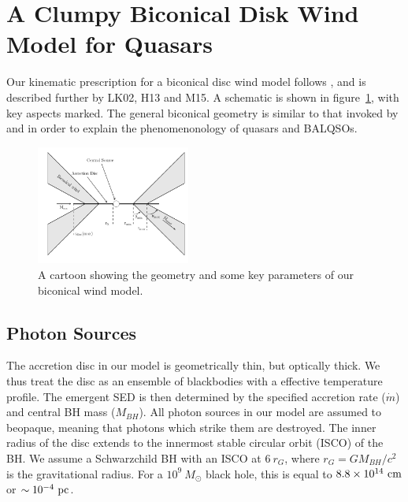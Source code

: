 \documentclass[useAMS,usenatbib]{mn2e_x}
\begin{document}




\section{A Clumpy Biconical Disk Wind Model for Quasars}

Our kinematic prescription for a biconical disc wind model
follows \cite{SV93}, and is described further by
LK02, H13 and M15. A schematic is shown in figure~\ref{fig:cartoon},
with key aspects marked. The general biconical
geometry is similar to that invoked by \cite{MCGV95} and 
\cite{elvis2000} in order to explain the phenomenonology
of quasars and BALQSOs.


\begin{figure} 
\centering
\includegraphics[width=0.45\textwidth]{figures/fig2_cartoon.png}
\caption
{
A cartoon showing the geometry and some key parameters of
our biconical wind model.
}
\label{fig:cartoon}
\end{figure} 





\subsection{Photon Sources}


The accretion disc in our model is geometrically thin, but optically thick.
We thus treat the disc as an ensemble of blackbodies with a 
\cite{shakurasunyaev1973} effective temperature profile. 
The emergent SED is then determined by the specified accretion rate ($\dot{m}$)
and central BH mass ($M_{BH}$).
All photon sources in our model are assumed to beopaque, meaning
that photons which strike them are destroyed.
The inner radius of the disc extends to the innermost 
stable circular orbit (ISCO) of the BH. 
We assume a Schwarzchild BH with an ISCO at $6~r_G$, where 
$r_G = GM_{BH}/c^2$ is the gravitational radius.
For a $10^9~M_\odot$ black hole, this is equal to $8.8\times10^{14}~{\rm cm}$ 
or $\sim10^{-4}~{\rm pc}$.  
\end{document}
